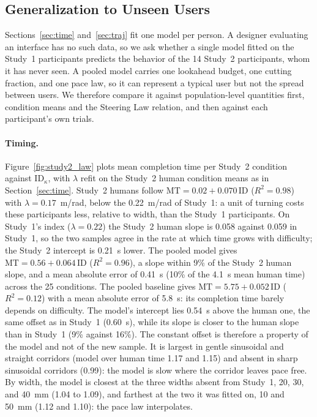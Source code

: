 
\subsection{Generalization to Unseen Users}
\label{sec:study2}

Sections~\ref{sec:time} and~\ref{sec:traj} fit one model per person. A
designer evaluating an interface has no such data, so we ask whether a
single model fitted on the Study~1 participants predicts the behavior of
the 14 Study~2 participants, whom it has never seen. A pooled model carries
one lookahead budget, one cutting fraction, and one pace law, so it can
represent a typical user but not the spread between users. We therefore
compare it against population-level quantities first, condition means and
the Steering Law relation, and then against each participant's own trials.

\paragraph{Timing.}
Figure~\ref{fig:study2_law} plots mean completion time per Study~2
condition against $\mathrm{ID}_\kappa$, with $\lambda$ refit on the Study~2
human condition means as in Section~\ref{sec:time}. Study~2 humans follow
$\mathrm{MT} = 0.02 + 0.070\,\mathrm{ID}$ ($R^2 = 0.98$) with
$\lambda = 0.17$~m/rad, below the 0.22~m/rad of Study~1: a unit of turning
costs these participants less, relative to width, than the Study~1
participants. On Study~1's index ($\lambda = 0.22$) the Study~2 human slope
is 0.058 against 0.059 in Study~1, so the two samples agree in the rate at
which time grows with difficulty; the Study~2 intercept is 0.21~s lower.
The pooled model gives $\mathrm{MT} = 0.56 + 0.064\,\mathrm{ID}$
($R^2 = 0.96$), a slope within 9\% of the Study~2 human slope, and a mean
absolute error of 0.41~s (10\% of the 4.1~s mean human time) across the 25
conditions. The pooled baseline gives $\mathrm{MT} = 5.75 + 0.052\,\mathrm{ID}$
($R^2 = 0.12$) with a mean absolute error of 5.8~s: its completion time
barely depends on difficulty. The model's intercept lies 0.54~s above the
human one, the same offset as in Study~1 (0.60~s), while its slope is
closer to the human slope than in Study~1 (9\% against 16\%). The constant
offset is therefore a property of the model and not of the new sample. It
is largest in gentle sinusoidal and straight corridors (model over human
time 1.17 and 1.15) and absent in sharp sinusoidal corridors (0.99): the
model is slow where the corridor leaves pace free.
By width, the model is closest at the three widths absent from Study~1,
20, 30, and 40~mm (1.04 to 1.09), and farthest at the two it was fitted
on, 10 and 50~mm (1.12 and 1.10): the pace law interpolates.


